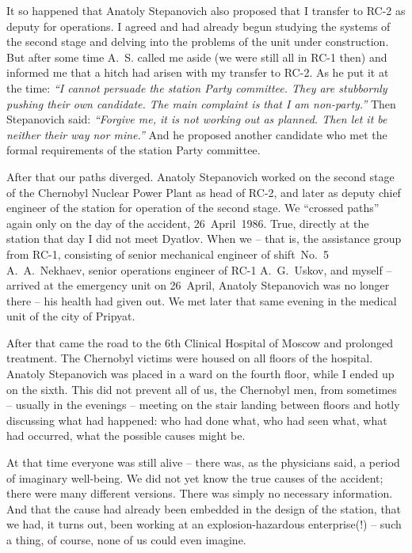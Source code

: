 \documentclass[openright]{bookest}
\begin{document}
It so happened that Anatoly Stepanovich also proposed that I transfer to RC-2 as deputy for operations. I agreed and had already begun studying the systems of the second stage and delving into the problems of the unit under construction. But after some time A.~S. called me aside (we were still all in RC-1 then) and informed me that a hitch had arisen with my transfer to RC-2. As he put it at the time: \textit{``I cannot persuade the station Party committee. They are stubbornly pushing their own candidate. The main complaint is that I am non-party.''} Then Stepanovich said: \textit{``Forgive me, it is not working out as planned. Then let it be neither their way nor mine.''} And he proposed another candidate who met the formal requirements of the station Party committee.

After that our paths diverged. Anatoly Stepanovich worked on the second stage of the Chernobyl Nuclear Power Plant as head of RC-2, and later as deputy chief engineer of the station for operation of the second stage. We ``crossed paths'' again only on the day of the accident, 26~April~1986. True, directly at the station that day I did not meet Dyatlov. When we -- that is, the assistance group from RC-1, consisting of senior mechanical engineer of shift~No.~5 A.~A.~Nekhaev, senior operations engineer of RC-1 A.~G.~Uskov, and myself -- arrived at the emergency unit on 26~April, Anatoly Stepanovich was no longer there -- his health had given out. We met later that same evening in the medical unit of the city of Pripyat.

After that came the road to the 6th Clinical Hospital of Moscow and prolonged treatment. The Chernobyl victims were housed on all floors of the hospital. Anatoly Stepanovich was placed in a ward on the fourth floor, while I ended up on the sixth. This did not prevent all of us, the Chernobyl men, from sometimes -- usually in the evenings -- meeting on the stair landing between floors and hotly discussing what had happened: who had done what, who had seen what, what had occurred, what the possible causes might be.

At that time everyone was still alive -- there was, as the physicians said, a period of imaginary well-being. We did not yet know the true causes of the accident; there were many different versions. There was simply no necessary information. And that the cause had already been embedded in the design of the station, that we had, it turns out, been working at an explosion-hazardous enterprise(!) -- such a thing, of course, none of us could even imagine.
\end{document}
